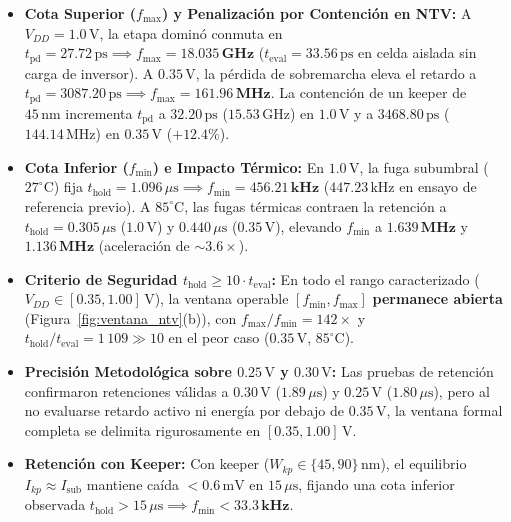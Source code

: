 \begin{itemize}[leftmargin=1.4em,itemsep=0.01em]
  \item \textbf{Cota Superior ($f_{\max}$) y Penalización por Contención en NTV:} A $V_{DD}=1.0\,\text{V}$, la etapa dominó conmuta en $t_{\text{pd}} = 27.72\,\text{ps} \implies f_{\max} = \mathbf{18.035\,\text{GHz}}$ ($t_{\text{eval}}=33.56\,\text{ps}$ en celda aislada sin carga de inversor). A $0.35\,\text{V}$, la pérdida de sobremarcha eleva el retardo a $t_{\text{pd}} = 3087.20\,\text{ps} \implies f_{\max} = \mathbf{161.96\,\text{MHz}}$. La contención de un keeper de $45\,\text{nm}$ incrementa $t_{\text{pd}}$ a $32.20\,\text{ps}$ ($15.53\,\text{GHz}$) en $1.0\,\text{V}$ y a $3468.80\,\text{ps}$ ($144.14\,\text{MHz}$) en $0.35\,\text{V}$ ($+12.4\%$).
  \item \textbf{Cota Inferior ($f_{\min}$) e Impacto Térmico:} En $1.0\,\text{V}$, la fuga subumbral ($27^\circ\text{C}$) fija $t_{\text{hold}} = 1.096\,\mu\text{s} \implies f_{\min} = \mathbf{456.21\,\text{kHz}}$ ($447.23\,\text{kHz}$ en ensayo de referencia previo). A $85^\circ\text{C}$, las fugas térmicas contraen la retención a $t_{\text{hold}} = 0.305\,\mu\text{s}$ ($1.0\,\text{V}$) y $0.440\,\mu\text{s}$ ($0.35\,\text{V}$), elevando $f_{\min}$ a $\mathbf{1.639\,\text{MHz}}$ y $\mathbf{1.136\,\text{MHz}}$ (aceleración de $\sim 3.6\times$).
  \item \textbf{Criterio de Seguridad $t_{\text{hold}} \ge 10 \cdot t_{\text{eval}}$:} En todo el rango caracterizado ($V_{DD} \in [0.35, 1.00]\,\text{V}$), la ventana operable $[f_{\min}, f_{\max}]$ \textbf{permanece abierta} (Figura~\ref{fig:ventana_ntv}(b)), con $f_{\max}/f_{\min} = 142\times$ y $t_{\text{hold}}/t_{\text{eval}} = 1\,109 \gg 10$ en el peor caso ($0.35\,\text{V}$, $85^\circ\text{C}$).
  \item \textbf{Precisión Metodológica sobre $0.25\,\text{V}$ y $0.30\,\text{V}$:} Las pruebas de retención confirmaron retenciones válidas a $0.30\,\text{V}$ ($1.89\,\mu\text{s}$) y $0.25\,\text{V}$ ($1.80\,\mu\text{s}$), pero al no evaluarse retardo activo ni energía por debajo de $0.35\,\text{V}$, la ventana formal completa se delimita rigurosamente en $[0.35, 1.00]\,\text{V}$.
  \item \textbf{Retención con Keeper:} Con keeper ($W_{kp} \in \{45, 90\}\,\text{nm}$), el equilibrio $I_{kp} \approx I_{\text{sub}}$ mantiene caída $<0.6\,\text{mV}$ en $15\,\mu\text{s}$, fijando una cota inferior observada $t_{\text{hold}} > 15\,\mu\text{s} \implies f_{\min} < \mathbf{33.3\,\text{kHz}}$.
\end{itemize}

